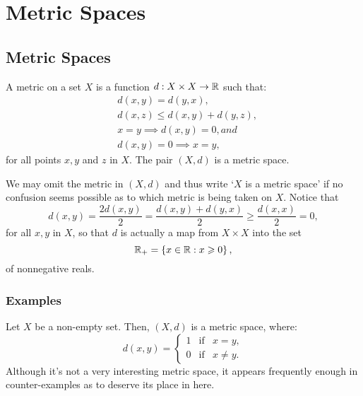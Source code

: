 \chapter{Metric Spaces}\label{chp:metric-spaces}

\section{Metric Spaces}\label{sec:metric-spaces}

\begin{definition}
  A metric on a set \(X\) is a function \(d:X\times{X}\to\mathbb{R}\) such that:
  \begin{align}
      & d(x,y)=d(y,x),                  \label{axiom:metric-space-01} \\
      & d(x,z)\leqslant{d(x,y)+d(y,z)}, \label{axiom:metric-space-02} \\
      & x=y\implies{d(x,y)=0}, and      \label{axiom:metric-space-03} \\
      & d(x,y)=0\implies{x=y},          \label{axiom:metric-space-04}
  \end{align}
  for all points \(x,y\) and \(z\) in \(X\). The pair \((X,d)\) is a metric
  space.
\end{definition}

We may omit the metric in \((X,d)\) and thus write `\(X\) is a metric space' if
no confusion seems possible as to which metric is being taken on \(X\). Notice
that
\[
  d(x,y)
  =
  \frac{2d(x,y)}{2}
  =
  \frac{d(x,y)+d(y,x)}{2}
  \geqslant
  \frac{d(x,x)}{2}
  =
  0,
\]
for all \(x,y\) in \(X\), so that \(d\) is actually a map from \(X\times{X}\)
into the set
\[
  \mathbb{R}_{+}
  =
  \left\{x\in\mathbb{R}:x\geqslant{0}\right\},
\]
of nonnegative reals.

\subsection{Examples}

\begin{example}\label{example:the-0-1-metric}
  Let \(X\) be a non-empty set. Then, \((X,d)\) is a metric space, where:
  \begin{equation*}
    d(x,y)=
    \left\{
      \begin{array}{lll}
        1 & \text{if} & x=y, \\
        0 & \text{if} & x\neq{y}.
      \end{array}
    \right.
  \end{equation*}
  Although it's not a very interesting metric space, it appears frequently
  enough in counter-examples as to deserve its place in here.
\end{example}

